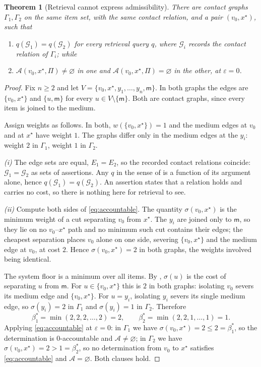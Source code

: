 \documentclass[11pt,twocolumn,a4paper]{article}
\theoremstyle{dirthm}
\newtheorem{theorem}{Theorem}[section]
\theoremstyle{definition}
\theoremstyle{remark}
\newcommand{\Gph}{\Gamma}
\newcommand{\V}{V}
\newcommand{\E}{E}
\newcommand{\wt}{w}
\newcommand{\med}{\mathsf{m}}
\newcommand{\flo}{\beta}
\newcommand{\str}{\sigma}
\newcommand{\Proc}{\Pi}
\newcommand{\acc}{\mathcal{A}}
\newcommand{\set}[1]{\{#1\}}
\newcommand{\eps}{\varepsilon}
\begin{document}
\begin{theorem}[Retrieval cannot express admissibility]
\label{thm:query-separation}
There are contact graphs $\Gph_1,\Gph_2$ on the same item set, with the same
contact relation, and a pair $(v_0,x^{\star})$, such that
\begin{enumerate}[label=\textup{(\roman*)},leftmargin=2.0em,itemsep=1pt]
\item $q(\mathcal{G}_1)=q(\mathcal{G}_2)$ for every retrieval query $q$,
where $\mathcal{G}_i$ records the contact relation of $\Gph_i$; while
\item $\acc(v_0,x^{\star},\Proc)\neq\varnothing$ in one and
$\acc(v_0,x^{\star},\Proc)=\varnothing$ in the other, at $\eps=0$.
\end{enumerate}
\end{theorem}

\begin{proof}
Fix $n\ge2$ and let $\V=\set{v_0,x^{\star},y_1,\dots,y_n,\med}$. In both
graphs the edges are $\set{v_0,x^{\star}}$ and $\set{u,\med}$ for every
$u\in\V\setminus\set{\med}$. Both are contact graphs, since every item is
joined to the medium.

Assign weights as follows. In both, $\wt(\set{v_0,x^{\star}})=1$ and the medium
edges at $v_0$ and at $x^{\star}$ have weight $1$. The graphs differ only in
the medium edges at the $y_i$: weight $2$ in $\Gph_1$, weight $1$ in $\Gph_2$.

\emph{(i)} The edge sets are equal, $\E_1=\E_2$, so the recorded contact
relations coincide: $\mathcal{G}_1=\mathcal{G}_2$ as sets of assertions. Any
$q$ in the sense of  is a function of its argument alone,
hence $q(\mathcal{G}_1)=q(\mathcal{G}_2)$. An assertion states that a relation
holds and carries no cost, so there is nothing here for retrieval to see.

\emph{(ii)} Compute both sides of \eqref{eq:accountable}. The quantity
$\str(v_0,x^{\star})$ is the minimum weight of a cut separating $v_0$ from
$x^{\star}$. The $y_i$ are joined only to $\med$, so they lie on no
$v_0$--$x^{\star}$ path and no minimum such cut contains their edges; the
cheapest separation places $v_0$ alone on one side, severing
$\set{v_0,x^{\star}}$ and the medium edge at $v_0$, at cost $2$. Hence
$\str(v_0,x^{\star})=2$ in both graphs, the weights involved being identical.

The system floor is a minimum over all items. By ,
$\str(u)$ is the cost of separating $u$ from $\med$. For $u\in\set{v_0,
x^{\star}}$ this is $2$ in both graphs: isolating $v_0$ severs its medium edge
and $\set{v_0,x^{\star}}$. For $u=y_i$, isolating $y_i$ severs its single
medium edge, so $\str(y_i)=2$ in $\Gph_1$ and $\str(y_i)=1$ in $\Gph_2$.
Therefore
\[
\flo^{\ast}_1=\min(2,2,2,\dots,2)=2,
\qquad
\flo^{\ast}_2=\min(2,2,1,\dots,1)=1 .
\]
Applying \eqref{eq:accountable} at $\eps=0$: in $\Gph_1$ we have
$\str(v_0,x^{\star})=2\le2=\flo^{\ast}_1$, so the determination is
$0$-accountable and $\acc\neq\varnothing$; in $\Gph_2$ we have
$\str(v_0,x^{\star})=2>1=\flo^{\ast}_2$, so no determination from $v_0$ to
$x^{\star}$ satisfies \eqref{eq:accountable} and $\acc=\varnothing$. Both
clauses hold.
\end{proof}
\end{document}
